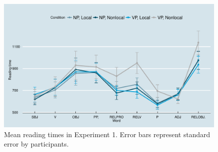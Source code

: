 \documentclass[12pt]{article}
\begin{document}
\begin{figure}
\begin{center}
\includegraphics{russian-extraposed-rcs-mainplot}
\end{center}
\caption{Mean reading times in Experiment 1. Error bars represent standard error by participants.}
\label{rtfig}
\end{figure}



\end{document}
